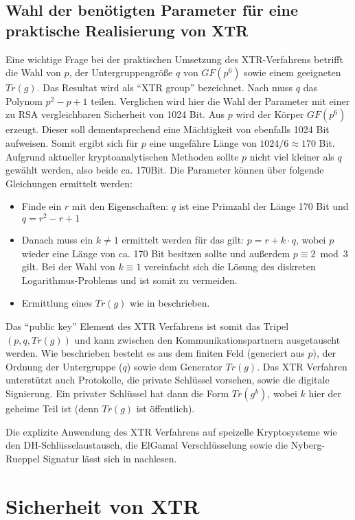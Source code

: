 \documentclass[10pt,        %
               a4paper,     %
               journal,     %
               ]{IEEEtran}
\begin{document}
\subsection{Wahl der benötigten Parameter für eine praktische Realisierung von XTR}
\label{subsec:paramwahl}
Eine wichtige Frage bei der praktischen Umsetzung des XTR-Verfahrens betrifft die Wahl von $p$, der Untergruppengröße $q$ von $GF(p^6)$ sowie einem geeigneten $Tr(g)$. Das Resultat wird als "`XTR group"' bezeichnet.
Nach \cite{xtr-explanation} muss $q$ das Polynom $p^2-p+1$ teilen.
Verglichen wird hier die Wahl der Parameter mit einer zu RSA vergleichbaren Sicherheit von 1024 Bit. Aus $p$ wird der Körper $GF(p^6)$ erzeugt.
Dieser soll dementsprechend eine Mächtigkeit von ebenfalls 1024 Bit aufweisen. Somit ergibt sich für $p$ eine ungefähre Länge von $1024/6\approx170$ Bit. Aufgrund aktueller kryptoanalytischen Methoden sollte $p$ nicht viel kleiner als $q$ gewählt werden, also beide ca. 170Bit.
Die Parameter können über folgende Gleichungen ermittelt werden:
\begin{itemize}
\item Finde ein $r$ mit den Eigenschaften: $q$ ist eine Primzahl der Länge 170 Bit und $q=r^2-r+1$  
\item Danach muss ein $k\neq 1$ ermittelt werden für das gilt: $p=r+k\cdot q$, wobei $p$ wieder eine Länge von ca. 170 Bit besitzen sollte und außerdem $p \equiv 2 \bmod 3$ gilt. Bei der Wahl von $k \equiv 1$ vereinfacht sich die Lösung des diskreten Logarithmus-Problems und ist somit zu vermeiden.
\item Ermittlung eines $Tr(g)$ wie in \cite{xtr-explanation} beschrieben.
\end{itemize}

Das "`public key"' Element des XTR Verfahrens ist somit das Tripel $(p,q,Tr(g))$ und kann zwischen den Kommunikationspartnern ausgetauscht werden.
Wie beschrieben besteht es aus dem finiten Feld (generiert aus $p$), der Ordnung der Untergruppe ($q$) sowie dem Generator $Tr(g)$.
Das XTR Verfahren unterstützt auch Protokolle, die private Schlüssel vorsehen, sowie die digitale Signierung. 
Ein privater Schlüssel hat dann die Form $Tr(g^k)$, wobei $k$ hier der geheime Teil ist (denn $Tr(g)$ ist öffentlich). 

Die explizite Anwendung des XTR Verfahrens auf speizelle Kryptosysteme wie den DH-Schlüsselaustausch, die ElGamal Verschlüsselung sowie die Nyberg-Rueppel Signatur lässt sich in \cite{xtr-explanation} nachlesen.

\section{Sicherheit von XTR}
\label{sec:sicherheit}
\end{document}
